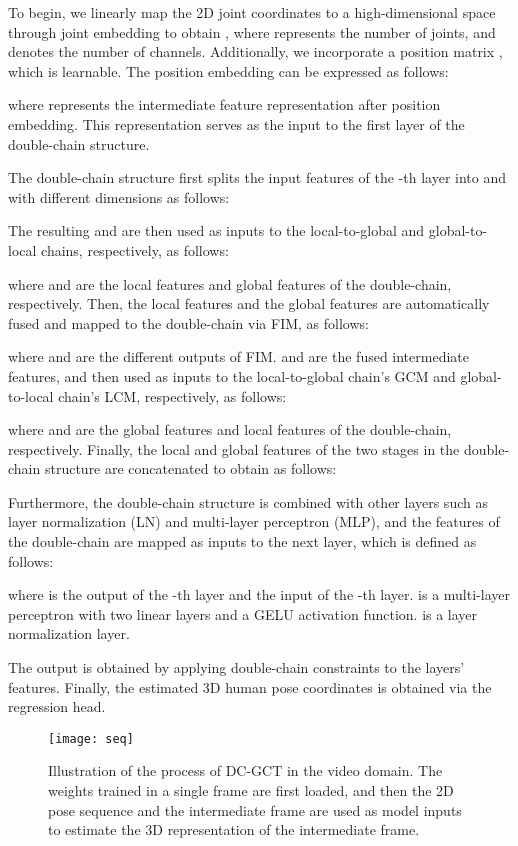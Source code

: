 \documentclass[journal]{IEEEtran}
\begin{document}
To begin, we linearly map the 2D joint coordinates  to a high-dimensional space through joint embedding to obtain , where  represents the number of joints, and  denotes the number of channels. Additionally, we incorporate a position matrix , which is learnable. The position embedding can be expressed as follows:

where  represents the intermediate feature representation after position embedding. This representation serves as the input to the first layer of the double-chain structure. 

The double-chain structure first splits the input features  of the -th layer into  and  with different dimensions as follows:

The resulting  and  are then used as inputs to the local-to-global and global-to-local chains, respectively, as follows:

where   and  are the local features and global features of the double-chain, respectively. Then, the local features  and the global features  are automatically fused and mapped to the double-chain via FIM, as follows:

where  and  are the different outputs of FIM.   and  are the fused intermediate features, and then used as inputs to the local-to-global chain's GCM and global-to-local chain's LCM, respectively, as follows:

where   and  are the global features and local features of the double-chain, respectively. Finally, the local and global features of the two stages in the double-chain structure are concatenated to obtain  as follows:




Furthermore, the double-chain structure is combined with other layers such as layer normalization (LN) and multi-layer perceptron (MLP), and the features of the double-chain are mapped as inputs to the next layer, which is defined as follows:

where  is the output of the -th layer and the input of the -th layer.  is a multi-layer perceptron with two linear layers and a GELU activation function.  is a layer normalization layer.


The output  is obtained by applying double-chain constraints to the  layers' features. Finally, the estimated 3D human pose coordinates  is obtained via the regression head.


\begin{figure}[t]
  \centering
  \texttt{[image: seq]}
  \caption{Illustration of the process of DC-GCT in the video domain. The weights trained in a single frame are first loaded, and then the 2D pose sequence and the intermediate frame are used as model inputs to estimate the 3D representation of the intermediate frame.}
\label{fig:seq}
\end{figure}
\end{document}
